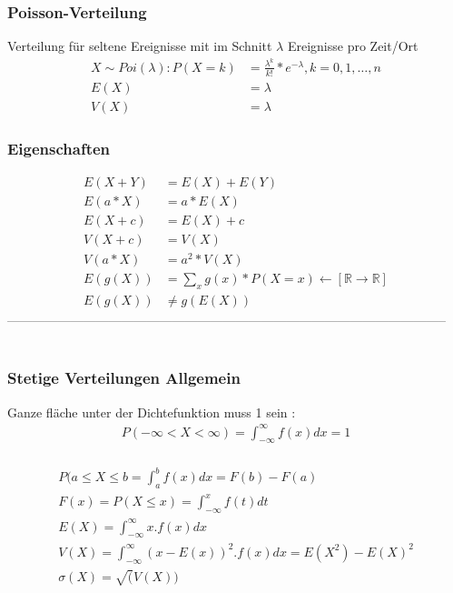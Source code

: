 \documentclass[landscape,twocolumn,a4paper]{article}
\newcommand{\RN}{\mathbb{R}} %
\begin{document}
\subsubsection*{Poisson-Verteilung}
Verteilung für seltene Ereignisse mit im Schnitt $\lambda$ Ereignisse pro Zeit/Ort
\begin{align}
	X \sim Poi(\lambda): P(X = k) &=\frac{\lambda^k}{k!}*e^{-\lambda}, k=0,1, \dots, n \\
	E(X) &= \lambda\\
	V(X) &= \lambda
\end{align} 

\subsubsection*{Eigenschaften}

\begin{align}
	E(X + Y) &= E(X) + E(Y) \\
	E(a * X) &= a * E(X) \\
	E(X + c) &= E(X) + c\\
	V(X + c) &= V(X) \\
	V(a * X) &= a^2* V(X) \\
	E(g(X)) &= \sum_{x} g(x) * P(X=x) \leftarrow [\RN \rightarrow \RN] \\
	E(g(X)) &\neq g(E(X))
\end{align} 
--------------------------------------------------------------------------------------------------------
\\
\\
\subsubsection*{Stetige Verteilungen Allgemein}
Ganze fläche unter der Dichtefunktion muss 1 sein :
\begin{align}
 P(-\infty < X < \infty) = \int^{\infty}_{-\infty} f(x)dx = 1\\
\end{align}

\begin{align}
 P(a \le X \le b = \int^b_a f(x)dx = F(b) - F(a)\\
 F(x) = P(X \le x) = \int_{-\infty}^{x} f(t)dt\\
 E(X) = \int_{-\infty}^{\infty} x.f(x)dx\\
 V(X) = \int_{-\infty}^{\infty} (x-E(x))^2 . f(x)dx = E(X^2) - E(X)^2 \\
 \sigma(X) = \sqrt(V(X))
\end{align}
\end{document}
